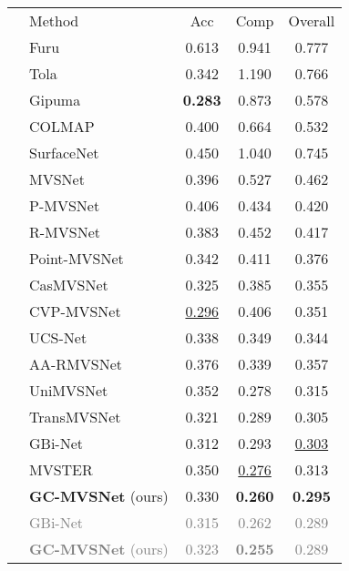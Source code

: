 \documentclass[10pt,twocolumn,letterpaper]{article}
\begin{document}
\begin{table}[t]
  \begin{center}
    {\footnotesize{
\begin{tabular}{clccc}
\toprule
& Method  & Acc  & Comp  & Overall  \\
\cmidrule{2-5}
\parbox[t]{2mm}{} & Furu \cite{Furukawa2010AccurateDA} & 0.613 & 0.941 & 0.777 \\
& Tola \cite{tola2011largescale} & 0.342 & 1.190 & 0.766 \\
& Gipuma \cite{Galliani2015fusibile}  & \textbf{0.283} & 0.873 & 0.578 \\
& COLMAP \cite{Johannes2016pixelwise}  &  0.400 & 0.664 & 0.532 \\ 
\parbox[t]{2mm}{}& SurfaceNet \cite{Ji2017surfacenet} & 0.450 & 1.040 & 0.745 \\
& MVSNet \cite{yao2018mvsnet}  & 0.396 & 0.527 & 0.462 \\
& P-MVSNet \cite{Luo2019Pmvsnet} &  0.406 & 0.434 & 0.420 \\
& R-MVSNet \cite{yao2019recurrent}  &  0.383 & 0.452 & 0.417 \\
& Point-MVSNet \cite{chen2019pointbased}  & 0.342 & 0.411 & 0.376 \\
& CasMVSNet \cite{gu2019casmvsnet}   & 0.325 & 0.385 & 0.355 \\
& CVP-MVSNet \cite{yang2019CVPMVS}  & \underline{0.296} & 0.406 & 0.351 \\
& UCS-Net \cite{Cheng2019USCNet}  & 0.338 & 0.349 & 0.344 \\
& AA-RMVSNet \cite{wei2021aa}  & 0.376 & 0.339 & 0.357 \\
& UniMVSNet \cite{peng2022rethinkingMVS}  & 0.352 & 0.278 & 0.315 \\
& TransMVSNet \cite{ding2022transmvsnet}  & 0.321 & 0.289 & 0.305\\
& GBi-Net \cite{mi2022gbi} & 0.312 & 0.293 & \underline{0.303} \\
& MVSTER \cite{wang2022mvster} & 0.350 & \underline{0.276} & 0.313 \\
& \textbf{GC-MVSNet} (ours) & 0.330 & \textbf{0.260} & \textbf{0.295}\\
& \textcolor{Gray}{GBi-Net \cite{mi2022gbi}} & \textcolor{Gray}{0.315} & \textcolor{Gray}{0.262} & \textcolor{Gray}{0.289} \\
& \textcolor{Gray}{\textbf{GC-MVSNet} (ours)} & \textcolor{Gray}{0.323} & \textcolor{Gray}{\textbf{0.255}} & \textcolor{Gray}{0.289}\\

\end{tabular}}}
\end{center}
\end{table}
\end{document}
